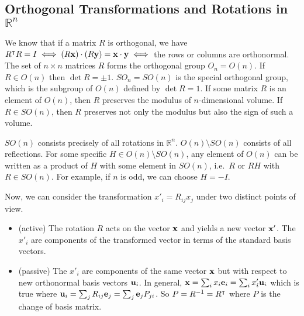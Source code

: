 \subsection{Orthogonal Transformations and Rotations in \(\mathbb R^n\)}
We know that if a matrix \(R\) is orthogonal, we have \(R^\intercal R = I \iff (R\vb x) \cdot (R\vb y) = \vb x \cdot \vb y \iff\) the rows or columns are orthonormal.
The set of \(n \times n\) matrices \(R\) forms the orthogonal group \(O_n = O(n)\).
If \(R \in O(n)\) then \(\det R = \pm 1\).
\(SO_n = SO(n)\) is the special orthogonal group, which is the subgroup of \(O(n)\) defined by \(\det R = 1\).
If some matrix \(R\) is an element of \(O(n)\), then \(R\) preserves the modulus of \(n\)-dimensional volume.
If \(R \in SO(n)\), then \(R\) preserves not only the modulus but also the sign of such a volume.

\(SO(n)\) consists precisely of all rotations in \(\mathbb R^n\).
\(O(n) \setminus SO(n)\) consists of all reflections.
For some specific \(H \in O(n) \setminus SO(n)\), any element of \(O(n)\) can be written as a product of \(H\) with some element in \(SO(n)\), i.e.\ \(R\) or \(RH\) with \(R \in SO(n)\).
For example, if \(n\) is odd, we can choose \(H = -I\).

Now, we can consider the transformation \(x'_i = R_{ij} x_j\) under two distinct points of view.
\begin{itemize}
	\item (active) The rotation \(R\) acts on the vector \(\vb x\) and yields a new vector \(\vb x'\).
	      The \(x'_i\) are components of the transformed vector in terms of the standard basis vectors.
	\item (passive) The \(x'_i\) are components of the same vector \(\vb x\) but with respect to new orthonormal basis vectors \(\vb u_i\).
	      In general, \(\vb x = \sum_i x_i \vb e_i = \sum_i x'_i \vb u_i\) which is true where \(\vb u_i = \sum_j R_{ij} \vb e_j = \sum_j \vb e_j P_{ji}\).
	      So \(P = R^{-1} = R^\intercal\) where \(P\) is the change of basis matrix.
\end{itemize}

